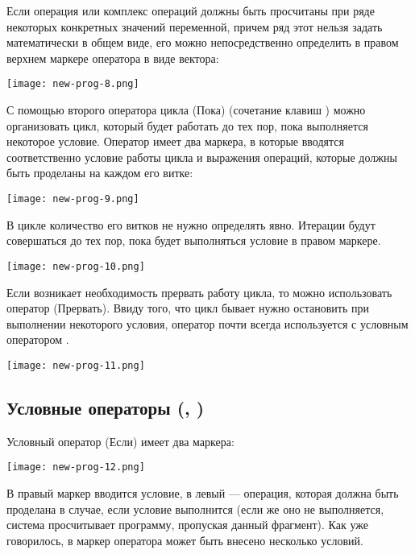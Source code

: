 Если операция или комплекс операций должны быть просчитаны при ряде некоторых конкретных значений переменной, причем ряд этот нельзя задать математически в общем виде, его можно непосредственно определить в правом верхнем маркере оператора  в виде вектора:
\begin{center}
	\texttt{[image: new-prog-8.png]}
\end{center}

С помощью второго оператора цикла  (Пока) (сочетание клавиш \keys{\ctrl+]} ) можно организовать цикл, который будет работать до тех пор, пока выполняется некоторое условие. Оператор  имеет два маркера, в которые вводятся соответственно условие работы цикла и выражения операций, которые должны быть проделаны на каждом его витке:
\begin{center}
	\texttt{[image: new-prog-9.png]}
\end{center}


В цикле  количество его витков не нужно определять явно. Итерации будут совершаться до тех пор, пока будет выполняться условие в правом маркере.

\begin{center}
	\texttt{[image: new-prog-10.png]}
\end{center}

Если возникает необходимость прервать работу цикла, то можно использовать оператор  (Прервать). Ввиду того, что цикл бывает нужно остановить при выполнении некоторого условия, оператор  почти всегда используется с условным оператором .

\begin{center}
	\texttt{[image: new-prog-11.png]}
\end{center}


\subsection*{Условные операторы (, )}
Условный оператор  (Если) имеет два маркера:
\begin{center}
	\texttt{[image: new-prog-12.png]}
\end{center}
В правый маркер вводится условие, в левый --- операция, которая должна быть проделана в случае, если условие выполнится (если же оно не выполняется, система просчитывает программу, пропуская данный фрагмент). Как уже говорилось, в маркер оператора может быть внесено несколько условий.

